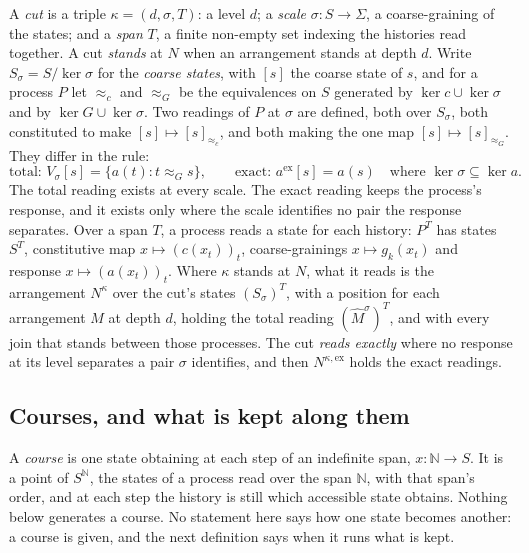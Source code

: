 \documentclass[11pt]{amsart}
\newcommand{\Exact}{\mathrm{ex}}
\theoremstyle{plain}
\begin{document}
A \emph{cut} is a triple $\kappa=(d,\sigma,T)$: a level $d$; a \emph{scale} $\sigma:S\to\Sigma$, a coarse-graining of the states; and a \emph{span} $T$, a finite non-empty set indexing the histories read together. A cut \emph{stands} at $N$ when an arrangement stands at depth $d$. Write $S_\sigma=S/\ker\sigma$ for the \emph{coarse states}, with $[s]$ the coarse state of $s$, and for a process $P$ let $\approx_c$ and $\approx_G$ be the equivalences on $S$ generated by $\ker c\cup\ker\sigma$ and by $\ker G\cup\ker\sigma$. Two readings of $P$ at $\sigma$ are defined, both over $S_\sigma$, both constituted to make $[s]\mapsto[s]_{\approx_c}$, and both making the one map $[s]\mapsto[s]_{\approx_G}$. They differ in the rule:
\begin{equation}\label{eq:readings}
  \text{total: }V_\sigma[s]=\bigl\{a(t):t\approx_Gs\bigr\},\qquad
  \text{exact: }a^{\Exact}[s]=a(s)\quad\text{where }\ker\sigma\subseteq\ker a.
\end{equation}
The total reading exists at every scale. The exact reading keeps the process's response, and it exists only where the scale identifies no pair the response separates. Over a span $T$, a process reads a state for each history: $P^T$ has states $S^T$, constitutive map $x\mapsto(c(x_t))_t$, coarse-grainings $x\mapsto g_k(x_t)$ and response $x\mapsto(a(x_t))_t$. Where $\kappa$ stands at $N$, what it reads is the arrangement $N^\kappa$ over the cut's states $(S_\sigma)^T$, with a position for each arrangement $M$ at depth $d$, holding the total reading $(\widehat M^\sigma)^T$, and with every join that stands between those processes. The cut \emph{reads exactly} where no response at its level separates a pair $\sigma$ identifies, and then $N^{\kappa,\Exact}$ holds the exact readings.

\subsection{Courses, and what is kept along them}

A \emph{course} is one state obtaining at each step of an indefinite span, $x:\mathbb{N}\to S$. It is a point of $S^{\mathbb{N}}$, the states of a process read over the span $\mathbb{N}$, with that span's order, and at each step the history is still which accessible state obtains. Nothing below generates a course. No statement here says how one state becomes another: a course is given, and the next definition says when it runs what is kept.
\end{document}
